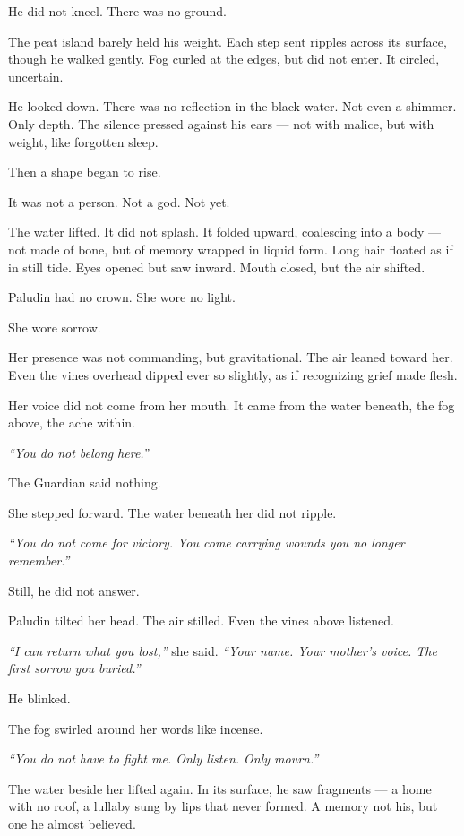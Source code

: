 \documentclass[9pt]{article}
\begin{document}
He did not kneel. There was no ground.

The peat island barely held his weight. Each step sent ripples across its surface, though he walked gently. Fog curled at the edges, but did not enter. It circled, uncertain.

He looked down. There was no reflection in the black water. Not even a shimmer. Only depth. The silence pressed against his ears — not with malice, but with weight, like forgotten sleep.

Then a shape began to rise.

It was not a person. Not a god. Not yet.

The water lifted. It did not splash. It folded upward, coalescing into a body — not made of bone, but of memory wrapped in liquid form. Long hair floated as if in still tide. Eyes opened but saw inward. Mouth closed, but the air shifted.

Paludin had no crown. She wore no light.

She wore sorrow.

Her presence was not commanding, but gravitational. The air leaned toward her. Even the vines overhead dipped ever so slightly, as if recognizing grief made flesh.

Her voice did not come from her mouth. It came from the water beneath, the fog above, the ache within.

\textit{``You do not belong here.''}

The Guardian said nothing.

She stepped forward. The water beneath her did not ripple.

\textit{``You do not come for victory. You come carrying wounds you no longer remember.''}

Still, he did not answer.

Paludin tilted her head. The air stilled. Even the vines above listened.

\textit{``I can return what you lost,''} she said. \textit{``Your name. Your mother’s voice. The first sorrow you buried.''}

He blinked.

The fog swirled around her words like incense.

\textit{``You do not have to fight me. Only listen. Only mourn.''}

The water beside her lifted again. In its surface, he saw fragments — a home with no roof, a lullaby sung by lips that never formed. A memory not his, but one he almost believed.
\end{document}
